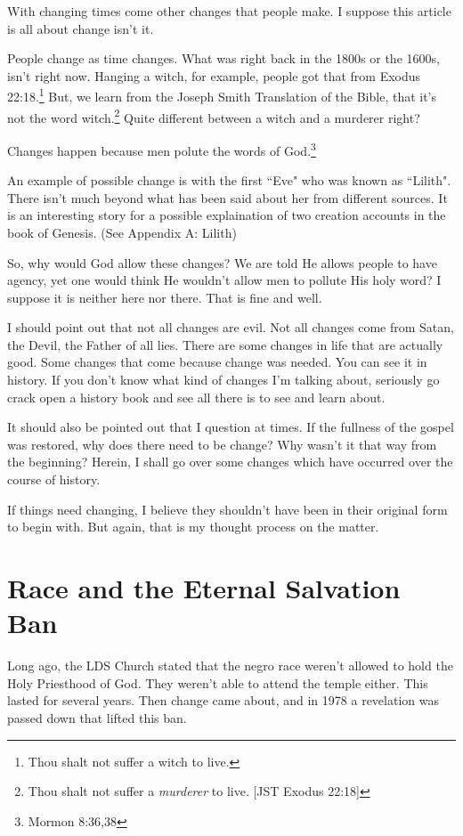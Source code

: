 \documentclass{article}
\begin{document}
With changing times come other changes that people make. I suppose this article 
is all about change isn't it.

People change as time changes. What was right back in the 1800s or the 1600s, 
isn't right now. Hanging a witch, for example, people got that from Exodus 
22:18.\footnote{Thou shalt not suffer a witch to live.} But, we learn from the 
Joseph Smith Translation of the Bible, that it's not the word 
witch.\footnote{Thou shalt not suffer a \textit{murderer} to live. 
[JST Exodus 22:18]} Quite different between a witch and a murderer right?

Changes happen because men polute the words of God.\footnote{Mormon 8:36,38}

An example of possible change is with the first ``Eve" who was known as
``Lilith". There isn't much beyond what has been said about her from different
sources. It is an interesting story for a possible explaination of two
creation accounts in the book of Genesis. (See Appendix A: Lilith)

So, why would God allow these changes? We are told He allows people to have
agency, yet one would think He wouldn't allow men to pollute His holy word?
I suppose it is neither here nor there. That is fine and well.

I should point out that not all changes are evil. Not all changes come from 
Satan, the Devil, the Father of all lies. There are some changes in life that 
are actually good. Some changes that come because change was needed. You can see 
it in history. If you don't know what kind of changes I'm talking about, 
seriously go crack open a history book and see all there is to see and learn 
about.

It should also be pointed out that I question at times. If the fullness of the 
gospel was restored, why does there need to be change? Why wasn't it that way 
from the beginning? Herein, I shall go over some changes which have occurred
over the course of history.

If things need changing, I believe they shouldn't have been in their original
form to begin with. But again, that is my thought process on the matter.

\newpage

\section{Race and the Eternal Salvation Ban}

Long ago, the LDS Church stated that the negro race weren't allowed to hold the 
Holy Priesthood of God. They weren't able to attend the temple either. This 
lasted for several years. Then change came about, and in 1978 a revelation was 
passed down that lifted this ban.
\end{document}
